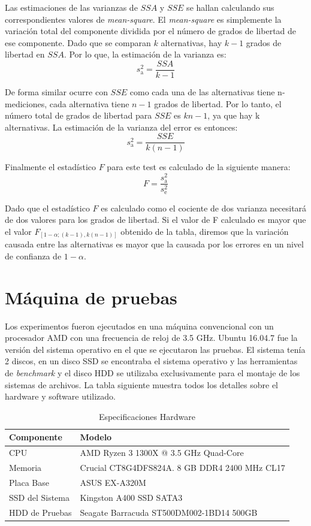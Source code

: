 Las estimaciones de las varianzas de $SSA$ y $SSE$ se hallan calculando sus correspondientes valores de \textit{mean-square}. El \textit{mean-square} es simplemente la variación total del componente dividida por el número de grados de libertad de ese componente. Dado que se comparan $k$ alternativas, hay $k-1$ grados de libertad en $SSA$. Por lo que, la estimación de la varianza es: $$
s_{\mathrm{a}}^{2}=\frac{S S A}{k-1}
$$

De forma similar ocurre con $SSE$ como cada una de las alternativas tiene n-mediciones, cada alternativa tiene $n-1$ grados de libertad. Por lo tanto, el número total de grados de libertad para $SSE$ es $kn-1$, ya que hay k alternativas. La estimación de la varianza del error es entonces: 
$$
s_{\mathrm{a}}^{2}=\frac{S S E}{k(n-1)}
$$

Finalmente el estadístico $F$ para este test es calculado de la siguiente manera: $$
F=\frac{s_{\mathrm{a}}^{2}}{s_{\mathrm{e}}^{2}}
$$

Dado que el estadístico $F$ es calculado como el cociente de dos varianza necesitará de dos valores para los grados de libertad. Si el valor de F calculado es mayor que el valor $F_{[1-\alpha ;(k-1), k(n-1)]}$ obtenido de la tabla, diremos que la variación causada entre las alternativas es mayor que la causada por los errores en un nivel de confianza de $1-\alpha$.



\section{Máquina de pruebas}
Los experimentos fueron ejecutados en una máquina convencional con un procesador AMD con una frecuencia de reloj de 3.5 GHz. Ubuntu 16.04.7 fue la versión del sistema operativo en el que se ejecutaron las pruebas. El sistema tenía 2 discos, en un disco SSD se encontraba el sistema operativo y las herramientas de \textit{benchmark} y el disco HDD se utilizaba exclusivamente para el montaje de los sistemas de archivos. La tabla siguiente muestra todos los detalles sobre el hardware y software utilizado.
\begin{table}[h]
    \centering
    \begin{tabular}{|l|l|}
    \hline
        Componente & Modelo \\ \hline\hline
        CPU & AMD Ryzen 3 1300X @ 3.5 GHz Quad-Core \\ \hline
        Memoria & Crucial CT8G4DFS824A. 8 GB DDR4 2400 MHz CL17 \\ \hline
        Placa Base & ASUS EX-A320M \\ \hline
        SSD del Sistema & Kingston A400 SSD SATA3 \\ \hline
        HDD de Pruebas & Seagate Barracuda ST500DM002-1BD14 500GB \\ \hline
    \end{tabular}
    \caption{Especificaciones Hardware}
\label{table:1}
\end{table}

